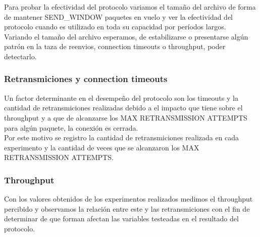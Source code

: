 Para probar la efectividad del protocolo variamos el tamaño del archivo de forma de mantener SEND\_WINDOW 
paquetes en vuelo y ver la efectividad del protocolo cuando es utilizado en toda su capacidad por períodos largos.	\\
\indent	Variando el tamaño del archivo esperamos, de estabilizarse o presentarse algún patrón en la taza de reenvios, connection timeouts o throughput, poder detectarlo.

\subsubsection{Retransmiciones y connection timeouts}

Un factor determinante en el desempeño del protocolo son los timeouts y la cantidad de retransmiciones realizadas debido a el impacto que tiene sobre el throughput y a que de alcanzarse los MAX RETRANSMISSION ATTEMPTS para algún paquete, la conexión es cerrada.	\\
\indent	Por este motivo se registro la cantidad de retransmiciones realizada en cada experimento y la cantidad de veces que se alcanzaron los MAX RETRANSMISSION ATTEMPTS.

\subsubsection{Throughput}

Con los valores obtenidos de los experimentos realizados medimos el throughput percibido y observamos la relación entre este y las retransmiciones con el fin de determinar de que forman afectan las variables testeadas en el resultado del protocolo.
